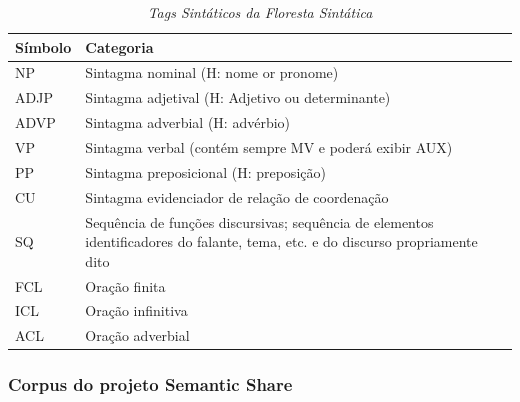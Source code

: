 \begin{table}
   \centering
   \small
   \caption{\it Tags Sintáticos da Floresta Sintática}

    \begin{tabular}{ | p{3cm} | p{10cm} | }
      \hline
        \textbf{Símbolo} & \textbf{Categoria}\\
        \hline
        \hline

            NP&Sintagma nominal
            (H: nome or pronome)\\
            \hline

            ADJP&Sintagma adjetival
            (H: Adjetivo ou determinante)\\
            \hline

            ADVP&Sintagma adverbial
            (H: advérbio)\\
            \hline

            VP&Sintagma verbal
            (contém sempre MV e poderá exibir AUX)\\
            \hline

            PP&Sintagma preposicional
            (H: preposição)\\
            \hline

            CU&Sintagma evidenciador de relação de coordenação\\
            \hline

            SQ&Sequência de funções discursivas; sequência de elementos identificadores do falante, tema, etc. e do discurso propriamente dito\\


            \hline

            FCL& Oração finita\\

            \hline

            ICL&Oração infinitiva\\

            \hline

            ACL&Oração adverbial\\

            \hline


   \end{tabular}
   \label{tbl:floresta_sintatica_cats}
\end{table}


\subsubsection{Corpus do projeto Semantic Share}
\label{sub:sub_semantic_corpus}

